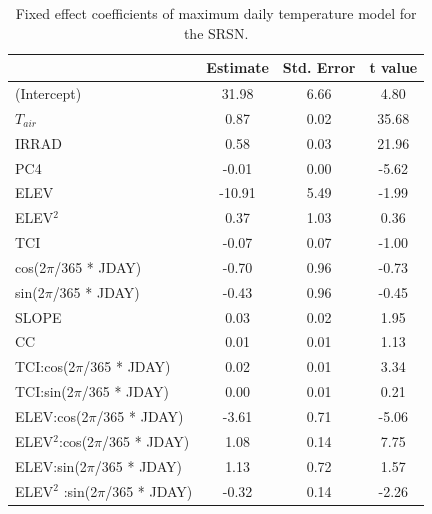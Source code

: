 \documentclass{ametsoc}
\begin{document}
\begin{table}[t]
\caption{Fixed effect coefficients of maximum daily temperature model for the SRSN.}
\begin{center}
\begin{tabular}{lccc}
\hline\hline
                                                 & Estimate & Std. Error & t value \\
\hline
(Intercept)                                      & 31.98    & 6.66       & 4.80    \\
$T_{air}$                                        & 0.87     & 0.02       & 35.68   \\
IRRAD                                            & 0.58     & 0.03       & 21.96   \\
PC4                                              & -0.01    & 0.00       & -5.62   \\
ELEV                                             & -10.91   & 5.49       & -1.99   \\
ELEV$^2$                                         & 0.37     & 1.03       & 0.36    \\
TCI                                              & -0.07    & 0.07       & -1.00   \\
cos(2$\pi$/365 * JDAY)                           & -0.70    & 0.96       & -0.73   \\
sin(2$\pi$/365 * JDAY)                           & -0.43    & 0.96       & -0.45   \\
SLOPE                                            & 0.03     & 0.02       & 1.95    \\
CC                                               & 0.01     & 0.01       & 1.13    \\
TCI:cos(2$\pi$/365 * JDAY)                       & 0.02     & 0.01       & 3.34    \\
TCI:sin(2$\pi$/365 * JDAY)                       & 0.00     & 0.01       & 0.21    \\
ELEV:cos(2$\pi$/365 * JDAY)                      & -3.61    & 0.71       & -5.06   \\
ELEV$^2$:cos(2$\pi$/365 * JDAY)                  & 1.08     & 0.14       & 7.75    \\
ELEV:sin(2$\pi$/365 * JDAY)                      & 1.13     & 0.72       & 1.57    \\
ELEV$^2$ :sin(2$\pi$/365 * JDAY)                 & -0.32    & 0.14       & -2.26   \\
\hline
\end{tabular}
\end{center}
\end{table}
\end{document}
